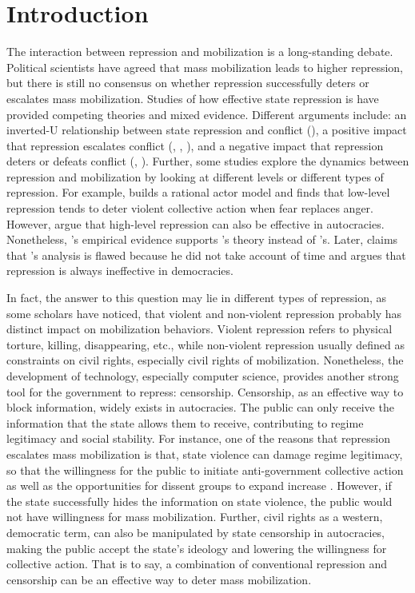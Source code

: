 \documentclass[11pt,]{article}
\begin{document}
\vskip 6.5pt


\noindent \doublespacing \section{Introduction}

The interaction between repression and mobilization is a long-standing
debate. Political scientists have agreed that mass mobilization leads to
higher repression, but there is still no consensus on whether repression
successfully deters or escalates mass mobilization. Studies of how
effective state repression is have provided competing theories and mixed
evidence. Different arguments include: an inverted-U relationship
between state repression and conflict (\citet{Muller1990}), a positive
impact that repression escalates conflict (\citet{MasonandKrane1989},
\citet{Goodwin2001}, \citet{Hultquist2017}), and a negative impact that
repression deters or defeats conflict (\citet{Downes2008},
\citet{Lyall2009}). Further, some studies explore the dynamics between
repression and mobilization by looking at different levels or different
types of repression. For example, \citet{Lichbach1987} builds a rational
actor model and finds that low-level repression tends to deter violent
collective action when fear replaces anger. However, \citet{Gupta1993}
argue that high-level repression can also be effective in autocracies.
Nonetheless, \citet{Moore1998}'s empirical evidence supports
\citet{Lichback1987}'s theory instead of \citet{Gupta1993}'s. Later,
\citet{Carey2006} claims that \citet{Moore1998}'s analysis is flawed
because he did not take account of time and argues that repression is
always ineffective in democracies.

In fact, the answer to this question may lie in different types of
repression, as some scholars have noticed, that violent and non-violent
repression probably has distinct impact on mobilization behaviors.
Violent repression refers to physical torture, killing, disappearing,
etc., while non-violent repression usually defined as constraints on
civil rights, especially civil rights of mobilization. Nonetheless, the
development of technology, especially computer science, provides another
strong tool for the government to repress: censorship. Censorship, as an
effective way to block information, widely exists in autocracies. The
public can only receive the information that the state allows them to
receive, contributing to regime legitimacy and social stability. For
instance, one of the reasons that repression escalates mass mobilization
is that, state violence can damage regime legitimacy, so that the
willingness for the public to initiate anti-government collective action
as well as the opportunities for dissent groups to expand increase
\citet{Greene1974}. However, if the state successfully hides the
information on state violence, the public would not have willingness for
mass mobilization. Further, civil rights as a western, democratic term,
can also be manipulated by state censorship in autocracies, making the
public accept the state's ideology and lowering the willingness for
collective action. That is to say, a combination of conventional
repression and censorship can be an effective way to deter mass
mobilization.
\end{document}

